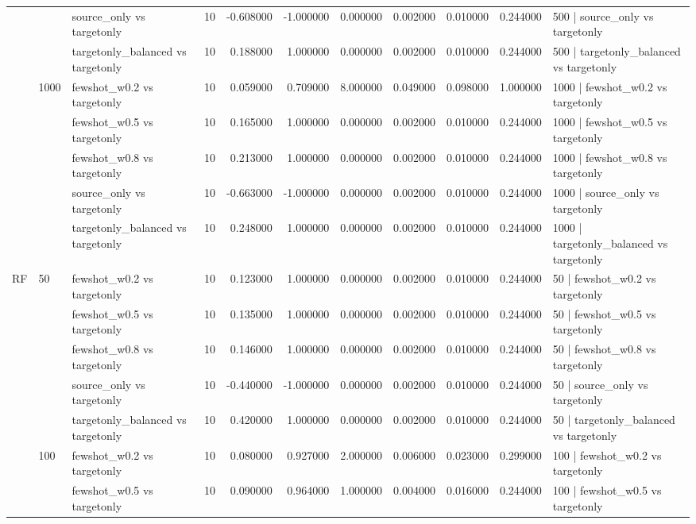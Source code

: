\begin{tabular}{lllrrrrrrrl}
 &  & source_only vs targetonly & 10 & -0.608000 & -1.000000 & 0.000000 & 0.002000 & 0.010000 & 0.244000 & 500 | source_only vs targetonly \\
 &  & targetonly_balanced vs targetonly & 10 & 0.188000 & 1.000000 & 0.000000 & 0.002000 & 0.010000 & 0.244000 & 500 | targetonly_balanced vs targetonly \\
\cline{2-11}
 & \multirow[t]{5}{*}{1000} & fewshot_w0.2 vs targetonly & 10 & 0.059000 & 0.709000 & 8.000000 & 0.049000 & 0.098000 & 1.000000 & 1000 | fewshot_w0.2 vs targetonly \\
 &  & fewshot_w0.5 vs targetonly & 10 & 0.165000 & 1.000000 & 0.000000 & 0.002000 & 0.010000 & 0.244000 & 1000 | fewshot_w0.5 vs targetonly \\
 &  & fewshot_w0.8 vs targetonly & 10 & 0.213000 & 1.000000 & 0.000000 & 0.002000 & 0.010000 & 0.244000 & 1000 | fewshot_w0.8 vs targetonly \\
 &  & source_only vs targetonly & 10 & -0.663000 & -1.000000 & 0.000000 & 0.002000 & 0.010000 & 0.244000 & 1000 | source_only vs targetonly \\
 &  & targetonly_balanced vs targetonly & 10 & 0.248000 & 1.000000 & 0.000000 & 0.002000 & 0.010000 & 0.244000 & 1000 | targetonly_balanced vs targetonly \\
\cline{1-11} \cline{2-11}
\multirow[t]{25}{*}{RF} & \multirow[t]{5}{*}{50} & fewshot_w0.2 vs targetonly & 10 & 0.123000 & 1.000000 & 0.000000 & 0.002000 & 0.010000 & 0.244000 & 50 | fewshot_w0.2 vs targetonly \\
 &  & fewshot_w0.5 vs targetonly & 10 & 0.135000 & 1.000000 & 0.000000 & 0.002000 & 0.010000 & 0.244000 & 50 | fewshot_w0.5 vs targetonly \\
 &  & fewshot_w0.8 vs targetonly & 10 & 0.146000 & 1.000000 & 0.000000 & 0.002000 & 0.010000 & 0.244000 & 50 | fewshot_w0.8 vs targetonly \\
 &  & source_only vs targetonly & 10 & -0.440000 & -1.000000 & 0.000000 & 0.002000 & 0.010000 & 0.244000 & 50 | source_only vs targetonly \\
 &  & targetonly_balanced vs targetonly & 10 & 0.420000 & 1.000000 & 0.000000 & 0.002000 & 0.010000 & 0.244000 & 50 | targetonly_balanced vs targetonly \\
\cline{2-11}
 & \multirow[t]{5}{*}{100} & fewshot_w0.2 vs targetonly & 10 & 0.080000 & 0.927000 & 2.000000 & 0.006000 & 0.023000 & 0.299000 & 100 | fewshot_w0.2 vs targetonly \\
 &  & fewshot_w0.5 vs targetonly & 10 & 0.090000 & 0.964000 & 1.000000 & 0.004000 & 0.016000 & 0.244000 & 100 | fewshot_w0.5 vs targetonly \\

\end{tabular}
